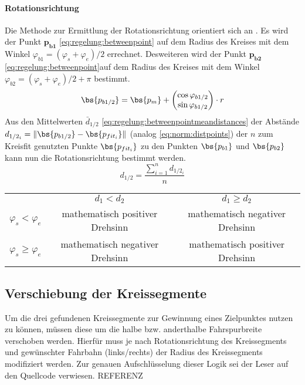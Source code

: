 \paragraph{Rotationsrichtung}
Die Methode zur Ermittlung der Rotationsrichtung orientiert sich an \autocite{drauschkeEchtzeitfaehigeStartpunktalgorithmenFuer2016}. Es wird der Punkt \(\boldsymbol{p_{b1}}\) \eqref{eq:regelung:betweenpoint} auf dem Radius des Kreises mit dem Winkel \(  \varphi_{b1} = (\varphi_s + \varphi_e)/2 \) errechnet.
Desweiteren wird der Punkt \(\boldsymbol{p_{b2}}\) \eqref{eq:regelung:betweenpoint}auf dem Radius des Kreises mit dem Winkel \(  \varphi_{b2} = (\varphi_s + \varphi_e)/2 + \pi \) bestimmt.
\begin{equation} \label{eq:regelung:betweenpoint}
\bs{p_{b1/2}} = \bs{p_m} + 
\begin{pmatrix}
\cos{\varphi_{b1/2}} \\
\sin{\varphi_{b1/2}}
\end{pmatrix}
\cdot r
\end{equation}
Aus den Mittelwerten \( \bar{d}_{1/2} \) \eqref{eq:regelung:betweenpointmeandistances} der Abstände \( d_{1/2_i} = \| \bs{p_{b1/2}} - \bs{p_{fit_i}}\| \) (analog \ref{eq:norm:distpoints}) der \(n\) zum Kreisfit genutzten Punkte \(\bs{p_{fit_i}}\) zu den Punkten \(\bs{p_{b1}}\) und \(\bs{p_{b2}}\) kann nun die Rotationsrichtung bestimmt werden.
\begin{equation} \label{eq:regelung:betweenpointmeandistances}
d_{1/2} = \frac{\sum_{i=1}^n d_{1/2_i}}{n} 
\end{equation}
\begin{tabular}{ccc}
& \(d_1<d_2\) & \(d_1\geq d_2\) \\
\(\varphi_s<\varphi_e\) &  mathematisch positiver Drehsinn & mathematisch negativer Drehsinn \\
\(\varphi_s\geq \varphi_e\) &  mathematisch negativer Drehsinn & mathematisch positiver Drehsinn
\end{tabular}

\subsection{Verschiebung der Kreissegmente}
Um die drei gefundenen Kreissegmente zur Gewinnung eines Zielpunktes nutzen zu können, müssen diese um die halbe bzw. anderthalbe Fahrspurbreite verschoben werden. Hierfür muss je nach Rotationsrichtung des Kreissegments und gewünschter Fahrbahn (links/rechts) der Radius des Kreissegments modifiziert werden. Zur genauen Aufschlüsselung dieser Logik sei der Leser auf den Quellcode verwiesen. REFERENZ

